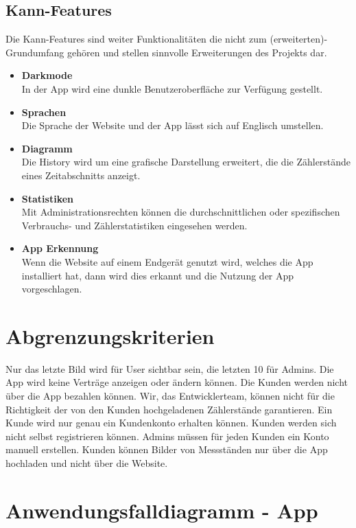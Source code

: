 \subsection{Kann-Features}
Die Kann-Features sind weiter Funktionalitäten die nicht zum (erweiterten)-Grundumfang gehören und stellen sinnvolle Erweiterungen des Projekts dar.
\begin{itemize}
\item  \textbf{Darkmode} \hfill \\
	In der App wird eine dunkle Benutzeroberfläche zur Verfügung gestellt.
\item \textbf{Sprachen} \hfill \\
	Die Sprache der Website und der App lässt sich auf Englisch umstellen.
\item \textbf{Diagramm} \hfill \\
	Die History wird um eine grafische Darstellung erweitert, die die Zählerstände eines Zeitabschnitts anzeigt.
\item \textbf{Statistiken} \hfill \\
	Mit Administrationsrechten können die durchschnittlichen oder spezifischen Verbrauchs- und Zählerstatistiken eingesehen werden.
\item \textbf{App Erkennung} \hfill \\
	Wenn die Website auf einem Endgerät genutzt wird, welches die App installiert hat, dann wird dies erkannt und die Nutzung der App vorgeschlagen.
\end{itemize}

\section{Abgrenzungskriterien}

Nur das letzte Bild wird für User sichtbar sein, die letzten 10 für Admins.
Die App wird keine Verträge anzeigen oder ändern können.
Die Kunden werden nicht über die App bezahlen können.
Wir, das Entwicklerteam, können nicht für die Richtigkeit der von den Kunden hochgeladenen Zählerstände garantieren.
Ein Kunde wird nur genau ein Kundenkonto erhalten können.
Kunden werden sich nicht selbst registrieren können. Admins müssen für jeden Kunden ein Konto manuell erstellen.
Kunden können Bilder von Messständen nur über die App hochladen und nicht über die Website.



\section{Anwendungsfalldiagramm - App}

